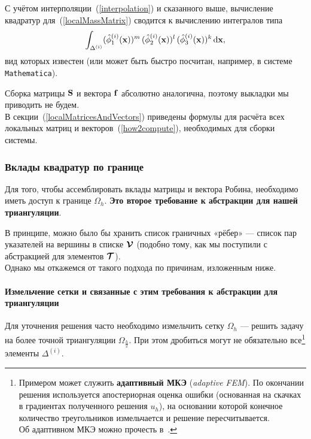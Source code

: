 С учётом интерполяции~(\ref{interpolation}) и сказанного выше, вычисление квадратур для~(\ref{localMassMatrix}) сводится к вычислению интегралов типа
\begin{equation}
	\int_{\Delta^{(i)}} (\hat{\phi}^{(i)}_1(\boldsymbol{\mathbf{x}}))^m \, (\hat{\phi}^{(i)}_2(\boldsymbol{\mathbf{x}}))^l \, (\hat{\phi}^{(i)}_3(\boldsymbol{\mathbf{x}}))^k \mathop{}\!\mathrm{d}{\boldsymbol{\mathbf{x}}},
\end{equation} 
вид которых известен (или может быть быстро посчитан, например, в системе \texttt{Mathematica}).

Сборка матрицы $\boldsymbol{\mathbf{S}}$ и вектора $\boldsymbol{\mathbf{f}}$ абсолютно аналогична, поэтому выкладки мы приводить не будем. \\
В секции~(\ref{localMatricesAndVectors}) приведены формулы для расчёта всех локальных матриц и векторов~(\ref{how2compute}), необходимых для сборки системы.

\subsubsection{Вклады квадратур по границе}
\label{boundaryAssembly}

Для того, чтобы ассемблировать вклады матрицы и вектора Робина, необходимо иметь доступ к границе $\Omega_h$. \textbf{Это второе требование к абстракции для нашей триангуляции}.

В принципе, можно было бы хранить список граничных «рёбер» --- список пар указателей на вершины в списке $\boldsymbol{\mathbf{\mathcal{V}}}$ (подобно тому, как мы поступили с абстракцией для элементов $\boldsymbol{\mathbf{\mathcal{T}}}$). \\
Однако мы откажемся от такого подхода по причинам, изложенным ниже.

\paragraph{Измельчение сетки и связанные с этим требования к абстракции для триангуляции}

Для уточнения решения часто необходимо измельчить сетку $\Omega_h$ --- решить задачу на более точной триангуляции $\Omega_\frac{h}{2}$. При этом дробиться могут не обязательно все\footnote{
	Примером может служить \textbf{адаптивный МКЭ} (\textit{adaptive FEM}). По окончании решения используется апостериорная оценка ошибки (основанная на скачках в градиентах полученного решения $u_h$), на основании которой конечное количество треугольников измельчается и решение пересчитывается.\\
	Об адаптивном МКЭ можно прочесть в~\cite[c.~97]{umea}.
} элементы $\Delta^{(i)}$.

